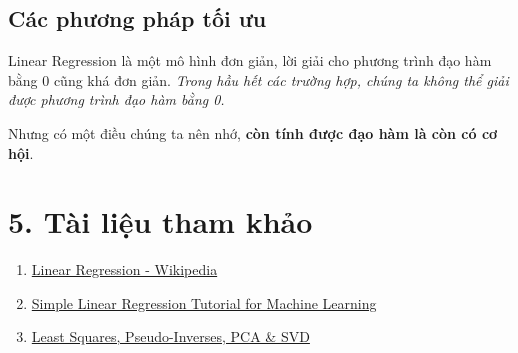 \subsection{Các phương pháp tối
ưu}\label{cuxe1c-phux1b0ux1a1ng-phuxe1p-tux1ed1i-ux1b0u}

Linear Regression là một mô hình đơn giản, lời giải cho phương trình đạo
hàm bằng 0 cũng khá đơn giản. \emph{Trong hầu hết các trường hợp, chúng
ta không thể giải được phương trình đạo hàm bằng 0.}

Nhưng có một điều chúng ta nên nhớ, \textbf{còn tính được đạo hàm là còn
có cơ hội}.

\section{5. Tài liệu tham
khảo}\label{tuxe0i-liux1ec7u-tham-khux1ea3o}

\begin{enumerate}
\def\labelenumi{\arabic{enumi}.}
\item
  \href{https://en.wikipedia.org/wiki/Linear_regression}{Linear
  Regression - Wikipedia}
\item
  \href{http://machinelearningmastery.com/simple-linear-regression-tutorial-for-machine-learning/}{Simple
  Linear Regression Tutorial for Machine Learning}
\item
  \href{http://www.sci.utah.edu/~gerig/CS6640-F2012/Materials/pseudoinverse-cis61009sl10.pdf}{Least
  Squares, Pseudo-Inverses, PCA \& SVD}
\end{enumerate}
